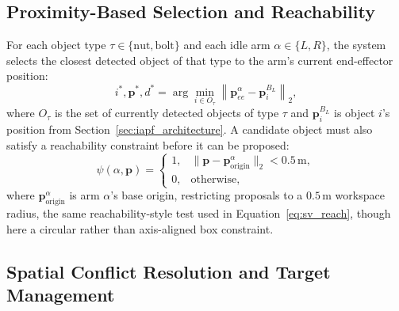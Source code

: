 \subsection{Proximity-Based Selection and Reachability}\label{subsec:cta_proximity}

For each object type $\tau \in \{\text{nut}, \text{bolt}\}$ and each idle arm $\alpha \in \{L, R\}$,
the system selects the closest detected object of that type to the arm's current end-effector
position:
\begin{equation}
i^*, \mathbf{p}^*, d^* = \arg\min_{i \in O_\tau} \left\lVert \mathbf{p}_{ee}^\alpha - \mathbf{p}^{B_L}_i \right\rVert_2,
\label{eq:cta_selection}
\end{equation}
where $O_\tau$ is the set of currently detected objects of type $\tau$ and $\mathbf{p}_i^{B_L}$ is object
$i$'s position from Section~\ref{sec:iapf_architecture}. A candidate object must also satisfy a
reachability constraint before it can be proposed:
\begin{equation}
\psi(\alpha, \mathbf{p}) =
\begin{cases}
1, & \lVert \mathbf{p} - \mathbf{p}_{\text{origin}}^\alpha \rVert_2 < 0.5\,\text{m}, \\
0, & \text{otherwise},
\end{cases}
\label{eq:cta_reachability}
\end{equation}
where $\mathbf{p}_{\text{origin}}^\alpha$ is arm $\alpha$'s base origin, restricting proposals to a $0.5$\,m
workspace radius, the same reachability-style test used in Equation~\eqref{eq:sv_reach}, though here
a circular rather than axis-aligned box constraint.

\subsection{Spatial Conflict Resolution and Target Management}\label{subsec:cta_conflict}

